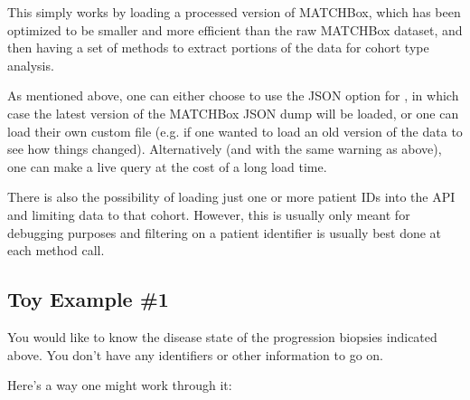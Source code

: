 \documentclass[letterpaper,10pt,english]{sphinxmanual}
\begin{document}
%
\begin{sphinxVerbatim}[commandchars=\\\{\}]
   
  
 
\end{sphinxVerbatim}

This simply works by loading a processed version of MATCHBox, which has been
optimized to be smaller and more efficient than the raw MATCHBox dataset, and
then having a set of methods to extract portions of the data for cohort type
analysis.

As mentioned above, one can either choose to use the  JSON option
for , in which case the latest version of the MATCHBox JSON dump will
be loaded, or one can load their own custom file (e.g. if one wanted to load an old
version of the data to see how things changed).  Alternatively (and with the same
warning as above), one can make a live query at the cost of a long load time.

There is also the possibility of loading just one or more patient IDs into the API
and limiting data to that cohort.  However, this is usually only meant for
debugging purposes and filtering on a patient identifier is usually best done at
each method call.


\subsection{Toy Example \#1}
\label{\detokenize{tutorial:toy-example-1}}
You would like to know the disease state of the progression biopsies indicated
above.  You don’t have any identifiers or other information to go on.

Here’s a way one might work through it:
\end{document}

